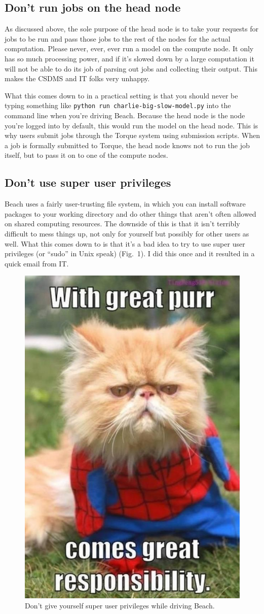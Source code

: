 \documentclass[12pt, oneside]{article}   	%
\begin{document}
\subsection{Don't run jobs on the head node}
As discussed above, the sole purpose of the head node is to take your requests for jobs to be run and pass those jobs to the rest of the nodes for the actual computation. Please never, \Large{ever,} \Huge{ever} \normalsize run a model on the compute node. It only has so much processing power, and if it's slowed down by a large computation it will not be able to do its job of parsing out jobs and collecting their output. This makes the CSDMS and IT folks very unhappy.\par
What this comes down to in a practical setting is that you should never be typing something like \texttt{python run charlie-big-slow-model.py} into the command line when you're driving Beach. Because the head node is the node you're logged into by default, this would run the model on the head node. This is why users submit jobs through the Torque system using submission scripts. When a job is formally submitted to Torque, the head node knows not to run the job itself, but to pass it on to one of the compute nodes.
\subsection{Don't use super user privileges}
Beach uses a fairly user-trusting file system, in which you can install software packages to your working directory and do other things that aren't often allowed on shared computing resources. The downside of this is that it isn't terribly difficult to mess things up, not only for yourself but possibly for other users as well. What this comes down to is that it's a bad idea to try to use super user privileges (or ``sudo'' in Unix speak) (Fig.\ 1). I did this once and it resulted in a quick email from IT. 
\begin{figure}[h]
    \centering
    \includegraphics[width=3 in]{18f}
    \caption{Don't give yourself super user privileges while driving Beach.}
    \label{fig:spiderCat}
\end{figure}
\end{document}
